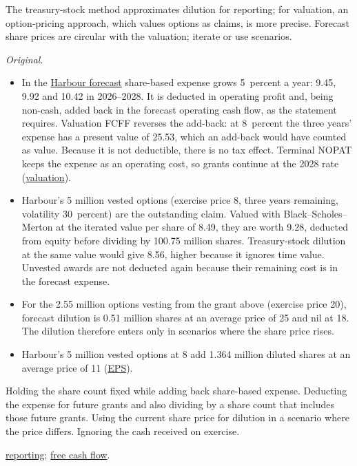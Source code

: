 \begin{qfmethod}
 The treasury-stock method approximates dilution for reporting; for valuation, an option-pricing approach, which values options as claims, is more precise. Forecast share prices are circular with the valuation; iterate or use scenarios.

 \emph{Original.}
\begin{itemize}
\item In the \hyperref[ex:harbour-pro-forma-model]{Harbour forecast} share-based expense grows 5~percent a year: 9.45, 9.92 and 10.42 in 2026--2028. It is deducted in operating profit and, being non-cash, added back in the forecast operating cash flow, as the statement requires. Valuation FCFF reverses the add-back: at 8~percent the three years' expense has a present value of 25.53, which an add-back would have counted as value. Because it is not deductible, there is no tax effect. Terminal NOPAT keeps the expense as an operating cost, so grants continue at the 2028 rate (\hyperref[meth:forecast-horizon-steady-state]{valuation}).
\item Harbour's 5 million vested options (exercise price 8, three years remaining, volatility 30~percent) are the outstanding claim. Valued with Black--Scholes--Merton at the iterated value per share of 8.49, they are worth 9.28, deducted from equity before dividing by 100.75 million shares. Treasury-stock dilution at the same value would give 8.56, higher because it ignores time value. Unvested awards are not deducted again because their remaining cost is in the forecast expense.
\item For the 2.55 million options vesting from the grant above (exercise price 20), forecast dilution is 0.51 million shares at an average price of 25 and nil at 18. The dilution therefore enters only in scenarios where the share price rises.
\item Harbour's 5 million vested options at 8 add 1.364 million diluted shares at an average price of 11 (\hyperref[meth:earnings-per-share]{EPS}).
\end{itemize}

 Holding the share count fixed while adding back share-based expense. Deducting the expense for future grants and also dividing by a share count that includes those future grants. Using the current share price for dilution in a scenario where the price differs. Ignoring the cash received on exercise.

 \hyperref[meth:share-based-compensation-reporting]{reporting}; \hyperref[meth:free-cash-flow-coverage]{free cash flow}.

\end{qfmethod}

